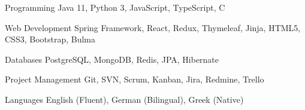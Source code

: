 


\begin{cvskills}


\cvskill
{Programming} %
{Java 11, Python 3, JavaScript, TypeScript, C} %


\cvskill
{Web Development} %
{Spring Framework, React, Redux, Thymeleaf, Jinja, HTML5, CSS3, Bootstrap, Bulma} %


\cvskill
{Databases} %
{PostgreSQL, MongoDB, Redis, JPA, Hibernate} %


\cvskill
{Project Management} %
{Git, SVN, Scrum, Kanban, Jira, Redmine, Trello} %


\cvskill
{Languages} %
{English (Fluent), German (Bilingual), Greek (Native)} %



\end{cvskills}